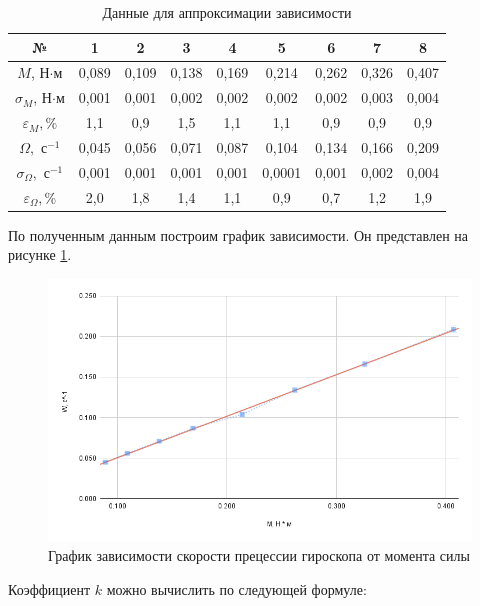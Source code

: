\documentclass[a4paper, 12pt]{article}
\begin{document}
\begin{center}
\begin{table}[H]
	\centering
	\begin{tabular}{|c|c|c|c|c|c|c|c|c|}
		\hline
		№             & 1  & 2  & 3  & 4  & 5 & 6 & 7 & 8 \\
		\hline \hline
		$ M $, Н$\cdot$м & 0,089 & 0,109 & 0,138 & 0,169 & 0,214 & 0,262 & 0,326 & 0,407\\ \hline
		$ \sigma_M $, Н$\cdot$м  & 0,001 & 0,001 & 0,002 & 0,002 & 0,002 & 0,002 & 0,003 & 0,004  \\ \hline
		$ \varepsilon_M, \% $  & 1,1  & 0,9  & 1,5 & 1,1 & 1,1 & 0,9 
        & 0,9 &  0,9\\ \hline \hline
		$ \Omega, \text{ с}^{-1} $ & 0,045 & 0,056 & 0,071 & 0,087 & 0,104 & 0,134 & 0,166 & 0,209 \\ \hline
		$ \sigma_\Omega, \text{ с}^{-1} $    & 0,001 & 0,001 & 0,001 & 0,001 & 0,0001 & 0,001 & 0,002 & 0,004 \\ \hline
		$ \varepsilon_\Omega, \% $ & 2,0 & 1,8 & 1,4 & 1,1 & 0,9 & 0,7 & 1,2 & 1,9   \\ \hline
	\end{tabular}
	\caption{Данные для аппроксимации зависимости}
	\label{mnk}
\end{table}

\newpage

По полученным данным построим график зависимости. Он представлен на рисунке \ref{graph}.

\begin{figure}[h!]
	\includegraphics[scale=0.7]{chart.png}
	\caption{График зависимости скорости прецессии гироскопа от момента силы}
	\label{graph}
\end{figure}


Коэффициент $ k $ можно вычислить по следующей формуле:\label{k}


\end{center}
\end{document}
